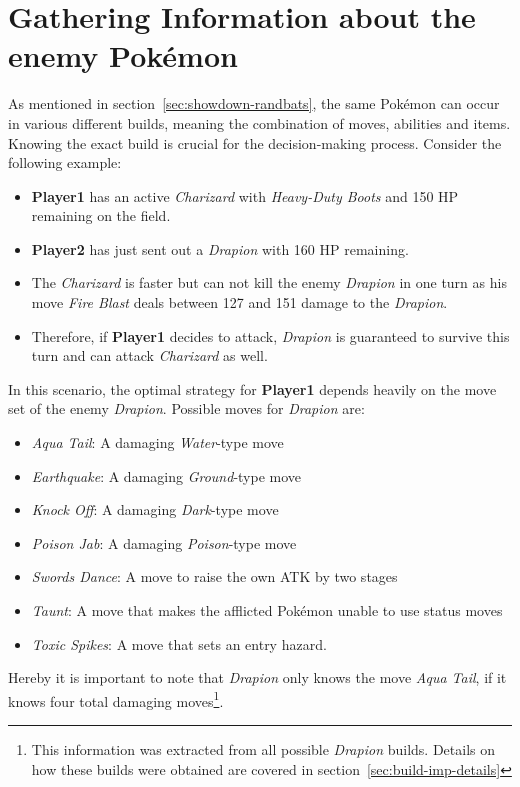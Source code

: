 \section{Gathering Information about the enemy Pokémon}
\label{sec:builds-randbats}
As mentioned in section~\ref{sec:showdown-randbats}, the same Pokémon can occur in various different builds, meaning the combination
of moves, abilities and items. Knowing the exact build is crucial for the decision-making process. Consider the following
example: 
\begin{itemize}
	\item \textbf{Player1} has an active \textit{Charizard} with \textit{Heavy-Duty Boots} and 150 \ac{HP} remaining on the field.
	\item \textbf{Player2} has just sent out a \textit{Drapion} with 160 \ac{HP} remaining.
	\item The \textit{Charizard} is faster but can not kill the enemy \textit{Drapion} in one turn as his move 
	\textit{Fire Blast} deals between 127 and 151 damage to the \textit{Drapion}. 
	\item Therefore, if \textbf{Player1} decides to attack, \textit{Drapion} is guaranteed to survive this turn
	and can attack \textit{Charizard} as well.
\end{itemize}
In this scenario, the optimal strategy for \textbf{Player1} depends heavily on the move set of the enemy \textit{Drapion}.
Possible moves for \textit{Drapion} are:
\begin{itemize}
	\item \textit{Aqua Tail}: A damaging \textit{Water}-type move
	\item \textit{Earthquake}: A damaging \textit{Ground}-type move
	\item \textit{Knock Off}: A damaging \textit{Dark}-type move
	\item \textit{Poison Jab}: A damaging \textit{Poison}-type move
	\item \textit{Swords Dance}: A move to raise the own \ac{ATK} by two stages
	\item \textit{Taunt}: A move that makes the afflicted Pokémon unable to use status moves
	\item \textit{Toxic Spikes}: A move that sets an entry hazard.
\end{itemize}
Hereby it is important to note that \textit{Drapion} only knows the move \textit{Aqua Tail}, if it knows four total 
damaging moves\footnote{This information was extracted from all possible \textit{Drapion} builds. Details on 
how these builds were obtained are covered in section~\ref{sec:build-imp-details}}. 

